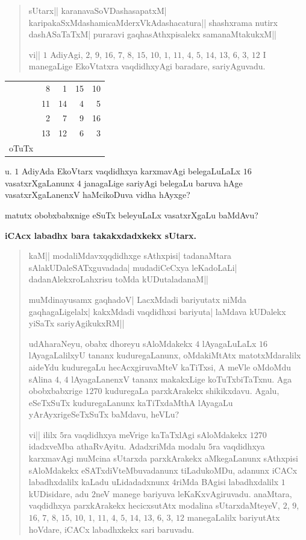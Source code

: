 \begin{verse}
sUtarx|| karanavaSoVDashasapatxM|
karipakaSxMdashamicaMderxVkAdashacatura|| shashxrama nutirx
dashASaTaTxM| pura\-ravi gaqhasAthxpisalekx samanaMtakukxM||

vi|| $1$ AdiyAgi, $2$, $9$, $16$, $7$, $8$, $15$, $10$, $1$, $11$,
$4$, $5$, $14$, $13$, $6$, $3$, $12$ I manegaLige EkoVtatxra
vaqdidhxyAgi baradare, sariyAguvadu.
\end{verse}

\begin{center}
\renewcommand{\arraystretch}{1.2}
\begin{tabular}{r|>{\rm}r|>{\rm}r|>{\rm}r|>{\rm}r|}
\cline{2-5}
 & 8 & 1 & 15 & 10\\
\cline{2-5}
 & 11 & 14 & 4 & 5\\
\cline{2-5}
 & 2 & 7 & 9 & 16\\
\cline{2-5}
 & 13 & 12 & 6 & 3\\
\cline{2-5}
\multicolumn{1}{c}{oTuTx} & \multicolumn{1}{r}{$34$}
& \multicolumn{1}{r}{$34$} & \multicolumn{1}{r}{$34$}
& \multicolumn{1}{r}{$34$} 
\end{tabular}
\end{center}


u. $1$ AdiyAda EkoVtarx vaqdidhxya karxmavAgi belegaLuLaLx $16$
vasatxrXgaLanunx $4$ janagaLige sariyAgi belegaLu baruva hAge
vasatxrXgaLanenxV haMcikoDuva vidha hAyxge?

matutx obobxbabxnige eSuTx beleyuLaLx vasatxrXgaLu baMdAvu?

\medskip
\begin{center}
{\large\bf iCAcx labadhx bara takakxdadxkekx sUtarx.}
\end{center}

\begin{verse}
kaM|| modaliMdavxqqdidhxge sAthxpisi| tadanaMtara
sAlakUDaleSATxguvadada| mudadiCeCxya leKadoLaLi| dadanAlekxroLahxrisu
toMda kUDutaladanaM||

muMdinayusamx gaqhadoV| LacxMdadi bariyutatx niMda gaqhagaLigelalx|
kakxMdadi vaqdidhxsi bariyuta| laMdava kUDalekx yiSaTx
sariyAgikukxRM||

udAharaNeyu, obabx dhoreyu sAloMdakekx $4$ lAyagaLuLaLx $16$
lAyagaLalilxyU tananx kuduregaLanunx, oMdakiMtAtx matotxMdaralilx
aideYdu kuduregaLu hecAcxgiruvaMteV kaTiTxsi, A meVle oMdoMdu sAlina
$4$, $4$ lAyagaLanenxV tananx makakxLige koTuTxbiTaTxnu. Aga
obobxbabxrige $1270$ kuduregaLa parxkArakekx shikikxdavu. Agalu,
eSeTxSuTx kuduregaLanunx kaTiTxdaMthA lAyagaLu yArAyxrigeSeTxSuTx
baMdavu, heVLu?

vi|| ililx $5$ra vaqdidhxya meVrige kaTaTxlAgi sAloMdakekx $1270$
idadxveMba athaRvAyitu. AdadxriMda modalu $5$ra vaqdidhxya karxmavAgi
muMcina sUtarxda parxkArakekx aMkegaLanunx sAthxpisi sAloMdakekx
eSATxdiVteMbuvadanunx tiLadukoMDu, adanunx iCACx labadhxdalilx kaLadu
uLidadadxnunx $4$riMda \hbox{BAgisi} labadhxdalilx $1$ kUDisidare, adu $2$neV
manege bariyuva leKaKxvAgiruvadu. anaMtara, \hbox{vaqdidhxya} parxkArakekx
hecicxsutAtx modalina sUtarxdaMteyeV, $2$, $9$, $16$, $7$, $8$, $15$,
$10$, $1$, $11$, $4$, $5$, $14$, $13$, $6$, $3$, $12$ manegaLalilx
bariyutAtx hoVdare, iCACx labadhxkekx sari baruvadu. 
\end{verse}

